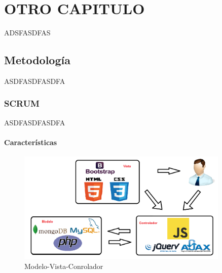 \chapter{OTRO CAPITULO}

ADSFASDFAS

\section{Metodología}
ASDFASDFASDFA

\subsection{SCRUM}

ASDFASDFASDFA


\subsubsection*{Características}

\begin{figure}[H]
\centering
\includegraphics[width=0.9\textwidth]{Figures/mvc.png}
\caption{Modelo-Vista-Conrolador}
\label{MVC}
\end{figure}


\afterpage{\blankpage}
